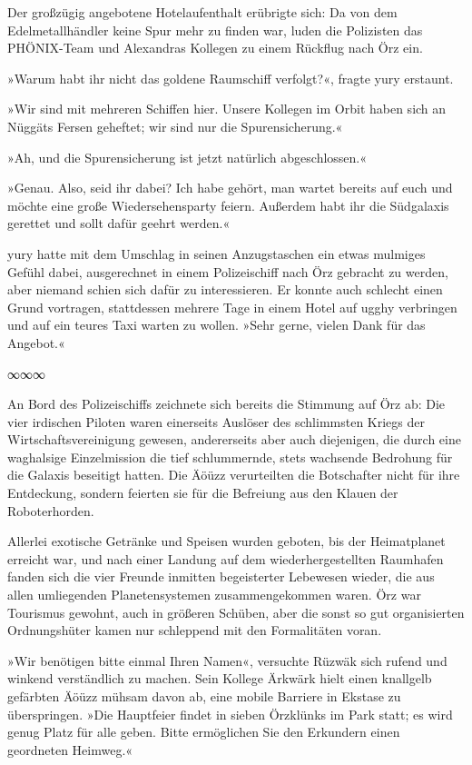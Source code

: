 Der großzügig angebotene Hotelaufenthalt erübrigte sich: Da von dem Edelmetallhändler keine Spur mehr zu finden war, luden die Polizisten das PHÖNIX-Team und Alexandras Kollegen zu einem Rückflug nach Örz ein.

»Warum habt ihr nicht das goldene Raumschiff verfolgt?«, fragte yury erstaunt.

»Wir sind mit mehreren Schiffen hier. Unsere Kollegen im Orbit haben sich an Nüggäts Fersen geheftet; wir sind nur die Spurensicherung.«

»Ah, und die Spurensicherung ist jetzt natürlich abgeschlossen.«

»Genau. Also, seid ihr dabei? Ich habe gehört, man wartet bereits auf euch und möchte eine große Wiedersehensparty feiern. Außerdem habt ihr die Südgalaxis gerettet und sollt dafür geehrt werden.«

yury hatte mit dem Umschlag in seinen Anzugstaschen ein etwas mulmiges Gefühl dabei, ausgerechnet in einem Polizeischiff nach Örz gebracht zu werden, aber niemand schien sich dafür zu interessieren. Er konnte auch schlecht einen Grund vortragen, stattdessen mehrere Tage in einem Hotel auf ugghy verbringen und auf ein teures Taxi warten zu wollen. »Sehr gerne, vielen Dank für das Angebot.«

\begin{center}
∞∞∞
\end{center}

An Bord des Polizeischiffs zeichnete sich bereits die Stimmung auf Örz ab: Die vier irdischen Piloten waren einerseits Auslöser des schlimmsten Kriegs der Wirtschaftsvereinigung gewesen, andererseits aber auch diejenigen, die durch eine waghalsige Einzelmission die tief schlummernde, stets wachsende Bedrohung für die Galaxis beseitigt hatten. Die Äöüzz verurteilten die Botschafter nicht für ihre Entdeckung, sondern feierten sie für die Befreiung aus den Klauen der Roboterhorden.

Allerlei exotische Getränke und Speisen wurden geboten, bis der Heimatplanet erreicht war, und nach einer Landung auf dem wiederhergestellten Raumhafen fanden sich die vier Freunde inmitten begeisterter Lebewesen wieder, die aus allen umliegenden Planetensystemen zusammengekommen waren. Örz war Tourismus gewohnt, auch in größeren Schüben, aber die sonst so gut organisierten Ordnungshüter kamen nur schleppend mit den Formalitäten voran.

»Wir benötigen bitte einmal Ihren Namen«, versuchte Rüzwäk sich rufend und winkend verständlich zu machen. Sein Kollege Ärkwärk hielt einen knallgelb gefärbten Äöüzz mühsam davon ab, eine mobile Barriere in Ekstase zu überspringen. »Die Hauptfeier findet in sieben Örzklünks im Park statt; es wird genug Platz für alle geben. Bitte ermöglichen Sie den Erkundern einen geordneten Heimweg.«

